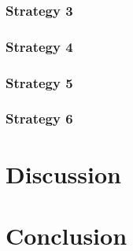 \documentclass[a4paper,10pt]{article}
\begin{document}
\subsubsection{Strategy 3}


\subsubsection{Strategy 4}



\subsubsection{Strategy 5}


\subsubsection{Strategy 6}

\section{Discussion} \label{Chapter5}

\newpage
\section{Conclusion} \label{Chapter6}
     
\end{document}
